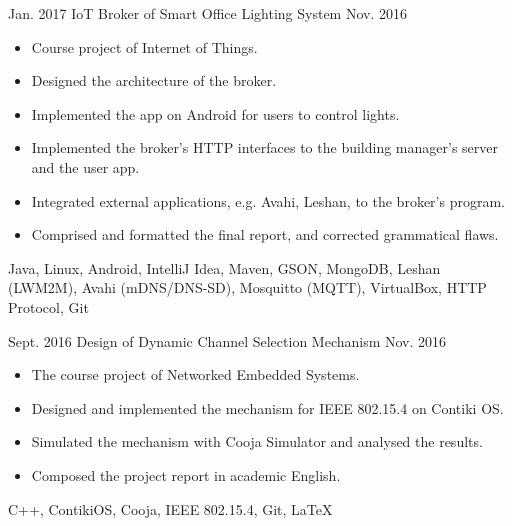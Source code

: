 %
%
%
%
%


\begin{projects}
  
  
  \project
    {Jan. 2017}   {IoT Broker of Smart Office Lighting System}
    {Nov. 2016} {
                      \begin{itemize}
                        \item Course project of Internet of Things.
                        \item Designed the architecture of the broker.
                        \item Implemented the app on Android for users to control lights.  
                        \item Implemented the broker’s HTTP interfaces to the building manager's server and the user app.
                        \item Integrated external applications, e.g. Avahi, Leshan, to the broker's program.
                        \item Comprised and formatted the final report, and corrected grammatical flaws.                                                                     
                      \end{itemize}
                    }
                    {Java, Linux, Android, IntelliJ Idea, Maven, GSON, MongoDB, Leshan (LWM2M), Avahi (mDNS/DNS-SD), Mosquitto (MQTT), VirtualBox, HTTP Protocol, Git}
  \emptySeparator
  
  
  \project
    {Sept. 2016} {Design of Dynamic Channel Selection Mechanism}
    {Nov. 2016}    {
                      \begin{itemize}
                        \item The course project of Networked Embedded Systems.
                        \item Designed and implemented the mechanism for IEEE 802.15.4 on Contiki OS. 
                        \item Simulated the mechanism with Cooja Simulator and analysed the results.
                        \item Composed the project report in academic English.
                      \end{itemize}
                    }
                    {C++, ContikiOS, Cooja, IEEE 802.15.4, Git, \LaTeX}
  \emptySeparator
  

\end{projects}
